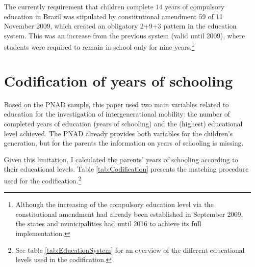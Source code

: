 \documentclass[a4paper, 12pt]{article}
\begin{document}
The currently requirement that children complete $14$ years of compulsory education in Brazil was stipulated by constitutional amendment 59 of 11 November 2009, which created an obligatory 2+9+3 pattern in the education system. This was an increase from the previous system (valid until 2009), where students were required to remain in school only for nine years.\footnote{Although the increasing of the compulsory education level via the constitutional amendment had already been established in September 2009, the states and municipalities had until 2016 to achieve its full implementation.}






\section{Codification of years of schooling}
\label{appendix:CodificationSchooling}


Based on the PNAD sample, this paper used two main variables related to education for the investigation of intergenerational mobility: the number of completed years of education (years of schooling) and the (highest) educational level achieved. The PNAD already provides both variables for the children’s generation, but for the parents the information on years of schooling is missing.
 
Given this limitation, I calculated the parents’ years of schooling according to their educational levels. Table \ref{tab:Codification} presents the matching procedure used for the codification.\footnote{See table \ref{tab:EducationSystem} for an overview of the different educational levels used in the codification.}
\end{document}
